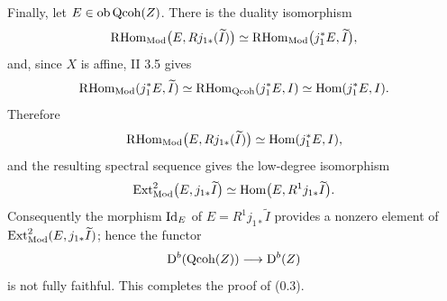 \documentclass[11pt]{article}
\begin{document}
Finally, let $E\in\operatorname{ob}\operatorname{Qcoh}(Z)$. There is the duality isomorphism
\[
\mathrm R\!\operatorname{Hom}_{\operatorname{Mod}}\bigl(E,Rj_{1*}(\widetilde I)\bigr)
\simeq
\mathrm R\!\operatorname{Hom}_{\operatorname{Mod}}\bigl(j_1^*E,\widetilde I\bigr),
\]
and, since $X$ is affine, II 3.5 gives
\[
\mathrm R\!\operatorname{Hom}_{\operatorname{Mod}}(j_1^*E,\widetilde I)
\simeq
\mathrm R\!\operatorname{Hom}_{\operatorname{Qcoh}}(j_1^*E,I)
\simeq
\operatorname{Hom}(j_1^*E,I).
\]
Therefore
\[
\mathrm R\!\operatorname{Hom}_{\operatorname{Mod}}\bigl(E,Rj_{1*}(\widetilde I)\bigr)
\simeq
\operatorname{Hom}(j_1^*E,I),
\]
and the resulting spectral sequence gives the low-degree isomorphism
\[
\operatorname{Ext}^2_{\operatorname{Mod}}\bigl(E,j_{1*}\widetilde I\bigr)
\simeq
\operatorname{Hom}\bigl(E,R^1j_{1*}\widetilde I\bigr).
\]
Consequently the morphism $\operatorname{Id}_E$ of $E=R^1j_{1*}\widetilde I$ provides a nonzero element of $\operatorname{Ext}^2_{\operatorname{Mod}}(E,j_{1*}\widetilde I)$; hence the functor
\[
\mathrm D^b(\operatorname{Qcoh}(Z))\longrightarrow\mathrm D^b(Z)
\]
is not fully faithful. This completes the proof of (0.3).
\end{document}
